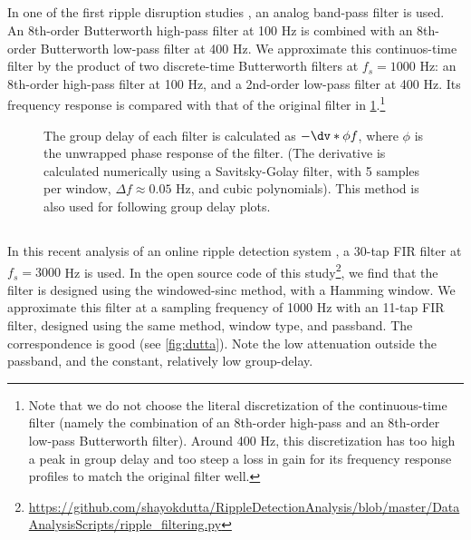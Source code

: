 \subsection{}

In one of the first ripple disruption studies \cite{Ego-Stengel2009}, an analog band-pass filter is used. An 8th-order Butterworth high-pass filter at 100 Hz is combined with an 8th-order Butterworth low-pass filter at 400 Hz.
We approximate this continuos-time filter by the product of two discrete-time Butterworth filters at $f_s = 1000$ Hz: an 8th-order high-pass filter at 100 Hz, and a 2nd-order low-pass filter at 400 Hz. Its frequency response is compared with that of the original filter in \cref{fig:ego-stengel}.\footnote{Note that we do not choose the literal discretization of the continuous-time filter (namely the combination of an 8th-order high-pass and an 8th-order low-pass Butterworth filter). Around 400 Hz, this discretization has too high a peak in group delay and too steep a loss in gain for its frequency response profiles to match the original filter well.}

\begin{figure}
{The group delay of each filter is calculated as $-\dv*{\phi}{f}$, where $\phi$ is the unwrapped phase response of the filter. (The derivative is calculated numerically using a Savitsky-Golay filter, with 5 samples per window, $\Delta f \approx 0.05$ Hz, and cubic polynomials). This method is also used for following group delay plots.}
\label{fig:ego-stengel}
\end{figure}


\subsection{}

In this recent analysis of an online ripple detection system \cite{Dutta2018}, a 30-tap FIR filter at $f_s = 3000$ Hz is used. In the open source code of this study\footnote{\url{https://github.com/shayokdutta/RippleDetectionAnalysis/blob/master/DataAnalysisScripts/ripple_filtering.py}}, we find that the filter is designed using the windowed-sinc method, with a Hamming window. We approximate this filter at a sampling frequency of 1000 Hz with an 11-tap FIR filter, designed using the same method, window type, and passband. The correspondence is good (see \cref{fig:dutta}). Note the low attenuation outside the passband, and the constant, relatively low group-delay.


